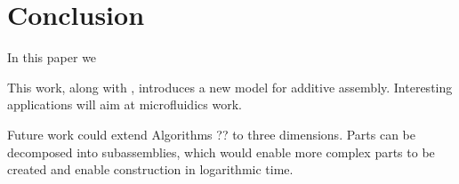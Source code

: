 
\section{Conclusion}\label{sec:Conclusion}
In this paper we 

This work, along with \cite{Becker2013f,Becker2014,Becker2014a}, introduces a
new model for additive assembly.  Interesting applications will aim at  microfluidics work.

Future work could extend Algorithms ?? to three dimensions. 
Parts can be decomposed into subassemblies, which would enable more complex parts to be created and enable construction in logarithmic time.
    